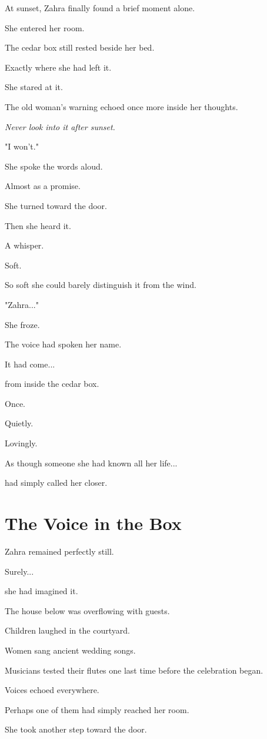 \documentclass[12pt,openany]{book}
\begin{document}
At sunset, Zahra finally found a brief moment alone.

She entered her room.

The cedar box still rested beside her bed.

Exactly where she had left it.

She stared at it.

The old woman's warning echoed once more inside her thoughts.

\emph{Never look into it after sunset.}

"I won't."

She spoke the words aloud.

Almost as a promise.

She turned toward the door.

Then she heard it.

A whisper.

Soft.

So soft she could barely distinguish it from the wind.

"Zahra..."

She froze.

The voice had spoken her name.

It had come...

from inside the cedar box.

Once.

Quietly.

Lovingly.

As though someone she had known all her life...

had simply called her closer.
\section*{The Voice in the Box}

Zahra remained perfectly still.

Surely...

she had imagined it.

The house below was overflowing with guests.

Children laughed in the courtyard.

Women sang ancient wedding songs.

Musicians tested their flutes one last time before the celebration began.

Voices echoed everywhere.

Perhaps one of them had simply reached her room.

She took another step toward the door.
\end{document}
